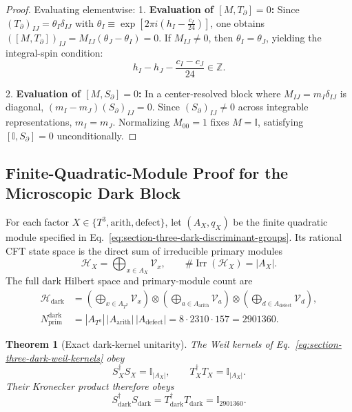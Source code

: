 \documentclass[11pt,letterpaper]{article}
\theoremstyle{plain}
\newtheorem{theorem}{Theorem}
\begin{document}
\begin{proof}
Evaluating elementwise:
1. \textbf{Evaluation of $[M, T_{\partial}] = 0$:}
Since $(T_{\partial})_{IJ} = \theta_I \delta_{IJ}$ with $\theta_I \equiv \exp\left[ 2\pi i \left( h_I - \frac{c_I}{24} \right) \right]$, one obtains $([M, T_{\partial}])_{IJ} = M_{IJ} (\theta_J - \theta_I) = 0$. If $M_{IJ} \neq 0$, then $\theta_I = \theta_J$, yielding the integral-spin condition:
\begin{equation}
h_I - h_J - \frac{c_I - c_J}{24} \in \mathbb{Z}.
\end{equation}

2. \textbf{Evaluation of $[M, S_{\partial}] = 0$:}
In a center-resolved block where $M_{IJ} = m_I \delta_{IJ}$ is diagonal, $(m_I - m_J) (S_{\partial})_{IJ} = 0$. Since $(S_{\partial})_{IJ} \neq 0$ across integrable representations, $m_I = m_J$. Normalizing $M_{00} = 1$ fixes $M = \mathbb{I}$, satisfying $[\mathbb{I}, S_{\partial}] = 0$ unconditionally.
\end{proof}

\subsection{Finite-Quadratic-Module Proof for the Microscopic Dark Block}
\label{app:dark-microscopic-modular-proof}

For each factor $X\in\{T^3,\mathrm{arith},\mathrm{defect}\}$, let
$(A_X,q_X)$ be the finite quadratic module specified in
Eq.~\eqref{eq:section-three-dark-discriminant-groups}.  Its rational CFT state
space is the direct sum of irreducible primary modules
\begin{equation}
\label{eq:appendix-a-dark-module-direct-sum}
 \mathcal H_X
 =
 \bigoplus_{x\in A_X}\mathcal V_x,
 \qquad
 \#\operatorname{Irr}(\mathcal H_X)=|A_X|.
\end{equation}
The full dark Hilbert space and primary-module count are
\begin{align}
\label{eq:appendix-a-dark-module-product}
 \mathcal H_{\text{dark}}
 &=
 \left(\bigoplus_{x\in A_{T^3}}\mathcal V_x\right)
 \otimes
 \left(\bigoplus_{a\in A_{\text{arith}}}\mathcal V_a\right)
 \otimes
 \left(\bigoplus_{d\in A_{\text{defect}}}\mathcal V_d\right),
 \\
 N_{\text{prim}}^{\text{dark}}
 &=
 |A_{T^3}|\,|A_{\text{arith}}|\,|A_{\text{defect}}|
 =
 8\cdot2310\cdot157
 =
 2901360.
\end{align}

\begin{theorem}[Exact dark-kernel unitarity]
The Weil kernels of Eq.~\eqref{eq:section-three-dark-weil-kernels} obey
\begin{equation}
\label{eq:appendix-a-factor-unitarity}
 S_X^\dagger S_X=\mathbb I_{|A_X|},
 \qquad
 T_X^\dagger T_X=\mathbb I_{|A_X|}.
\end{equation}
Their Kronecker product therefore obeys
\begin{equation}
\label{eq:appendix-a-dark-unitarity}
 S_{\text{dark}}^\dagger S_{\text{dark}}
 =
 T_{\text{dark}}^\dagger T_{\text{dark}}
 =
 \mathbb I_{2901360}.
\end{equation}
\end{theorem}
\end{document}
